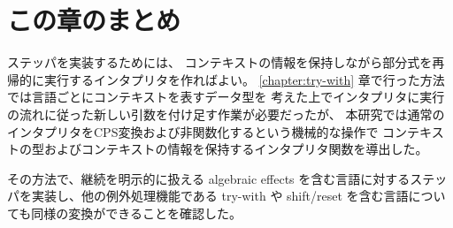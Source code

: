\section{この章のまとめ}
\label{section:conclusion}

ステッパを実装するためには、
コンテキストの情報を保持しながら部分式を再帰的に実行するインタプリタを作ればよい。
\ref{chapter:try-with} 章で行った方法では言語ごとにコンテキストを表すデータ型を
考えた上でインタプリタに実行の流れに従った新しい引数を付け足す作業が必要だったが、
本研究では通常のインタプリタをCPS変換および非関数化するという機械的な操作で
コンテキストの型およびコンテキストの情報を保持するインタプリタ関数を導出した。

その方法で、継続を明示的に扱える algebraic effects を含む言語に対するステッパを実装し、他の例外処理機能である try-with や shift/reset を含む言語についても同様の変換ができることを確認した。
